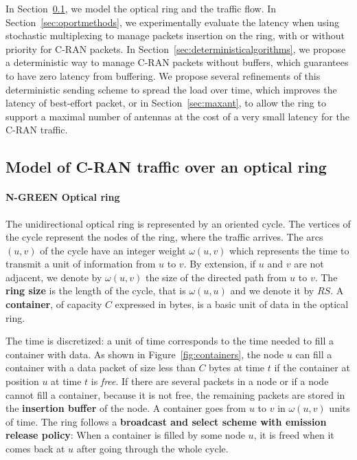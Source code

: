 In Section~\ref{sec:modelngreen}, we model the optical ring and the traffic flow. In Section~\ref{sec:oportmethods}, we experimentally evaluate the latency when using stochastic multiplexing to manage packets insertion on the ring, with or without priority for C-RAN packets. In Section~\ref{sec:deterministicalgorithms}, we propose a deterministic way to manage C-RAN packets without buffers, which guarantees to have zero latency from buffering. We propose several refinements of this deterministic sending scheme to spread the load over time, which improves the latency of best-effort packet, or in Section~\ref{sec:maxant}, to allow the ring to support a maximal number of antennas at the cost of a very small latency for the C-RAN traffic. 

\subsection{Model of C-RAN traffic over an optical ring}
\label{sec:modelngreen}
    
  \paragraph{N-GREEN Optical ring}
   
  The unidirectional optical ring is represented by an oriented cycle. The vertices of the cycle represent the nodes of the ring, where the traffic arrives. The arcs $(u,v)$ of the cycle have an integer weight $\omega(u,v)$ which represents the time to transmit a unit of information from $u$ to $v$. By extension, if $u$ and $v$ are not adjacent, we denote by $\omega(u,v)$ the size of the directed path from $u$ to $v$.  The \textbf{ring size} is the length of the cycle, that is $\omega(u,u)$ and we denote it by $RS$. A {\bf container}, of capacity $C$  expressed in bytes, is a basic unit of data in the optical ring. 
  
  The time is discretized: a unit of time corresponds to the time needed to fill a container with data.
  As shown in Figure~\ref{fig:containers}, the node $u$ can fill a container with a data packet of size less than $C$ bytes at time $t$ if the container at position $u$ at time $t$ is \emph{free}. 
  If there are several packets in a node or if a node cannot fill a container, because it is not free, 
  the remaining packets are stored in the {\bf insertion buffer} of the node. 
  A container goes from $u$ to $v$ in $\omega(u,v)$ units of time. The ring follows a {\bf broadcast and select scheme with emission release policy}: When a container is filled by some node $u$, it is freed when it comes back at $u$ after going through the whole cycle.
   
